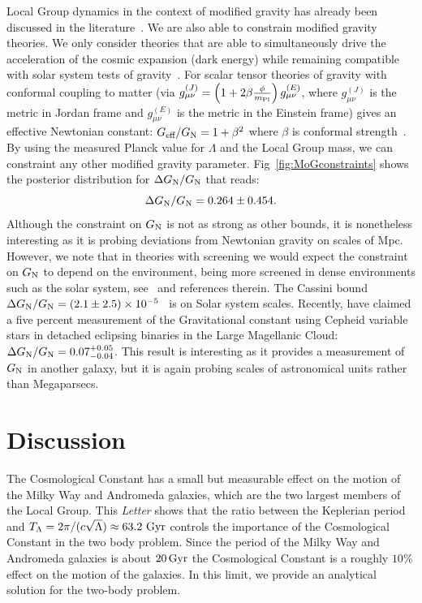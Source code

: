Local Group dynamics in the context of modified gravity has already been discussed in the literature~\citep{McLeod:2019cfg,Benisty:2023ofi}. We are also able to constrain modified gravity theories. We only consider theories that are able to simultaneously drive the acceleration of the cosmic expansion (dark energy) while remaining compatible with solar system tests of gravity~\citep{Brax:2008hh,Benisty:2022lox}. For scalar tensor theories of gravity with conformal coupling to matter (via ${g}_{\mu\nu}^{(J)} =  \left(1+{2\beta}\frac{\phi}{m_{\rm Pl}}\right) g_{\mu\nu}^{(E)}$, where ${g}_{\mu\nu}^{\left(J\right)}$ is the metric in Jordan frame and $g_{\mu\nu}^{\left(E\right)} $ is the metric in the Einstein frame) gives an effective Newtonian constant: $G_{\text{eff}}/G_{\rm N} = 1 + \beta^2$ where $\beta$ is conformal strength~\citep{Brax:2019tcy}. By using the measured Planck value for $\Lambda$ and the Local Group mass, we can constraint any other modified gravity parameter. Fig~\ref{fig:MoGconstraints} shows the posterior distribution for $\Delta G_{\rm N}/G_{\rm N}$ that reads: 
%
\begin{equation}
 {\Delta G_{\rm N}/G_{\rm N} = 0.264 \pm 0.454. }
\end{equation}
%
Although the constraint on $G_{\rm N}$ is not as strong as other bounds, it is nonetheless interesting as it is probing deviations from Newtonian gravity on scales of Mpc. However, we note that in theories with screening we would expect the constraint on $G_{\rm N}$ to depend on the environment, being more screened in dense environments such as the solar system, see~\citep{Benisty:2022lox} and references therein. The Cassini bound $\Delta G_{\rm N}/G_{\rm N} = \left(2.1 \pm 2.5 \right) \times 10^{-5}$~\citep{Bertotti:2003rm} is on Solar system scales. Recently, \citet{Desmond:2020nde} have  claimed a five percent measurement of the Gravitational constant using Cepheid variable stars in detached eclipsing binaries in the Large Magellanic Cloud: $\Delta G_{\rm N}/G_{\rm N} = 0.07^{+0.05}_{-0.04}$. This result is interesting as it provides a measurement of $G_{\rm N}$ in another galaxy, but it is again probing scales of astronomical units rather than Megaparsecs.


\section{Discussion}  

The Cosmological Constant has a small but measurable effect on the motion of the Milky Way and Andromeda galaxies, which are the two largest members of the Local Group. This {\it Letter} shows that the ratio between the Keplerian period and $T_\Lambda = 2 \pi /(c \sqrt{\Lambda}) \approx 63.2 \,\, {\rm Gyr}$ controls the importance of the Cosmological Constant in the two body problem. Since the period of the Milky Way and Andromeda galaxies is about $20 \, {\rm Gyr}$ the Cosmological Constant is a roughly $10\%$ effect on the motion of the galaxies. In this limit, we provide an analytical solution for the two-body problem.


